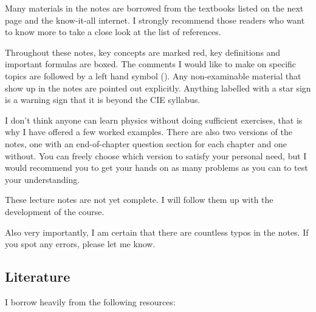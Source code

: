 Many materials in the notes are borrowed from the textbooks listed on the next page and the know-it-all internet. I strongly recommend those readers who want to know more to take a close look at the list of references.

Throughout these notes, key concepts are marked red, key definitions and important formulas are boxed. The comments I would like to make on specific topics are followed by a left hand symbol (). Any non-examinable material that show up in the notes are pointed out explicitly. Anything labelled with a star sign is a warning sign that it is beyond the CIE syllabus.

I don't think anyone can learn physics without doing sufficient exercises, that is why I have offered a few worked examples. There are also two versions of the notes, one with an end-of-chapter question section for each chapter and one without. You can freely choose which version to satisfy your personal need, but I would recommend you to get your hands on as many problems as you can to test your understanding.

These lecture notes are not yet complete. I will follow them up with the development of the course.

Also very importantly, I am certain that there are countless typos in the notes. If you spot any errors, please let me know.



\subsection*{Literature}

I borrow heavily from the following resources:

